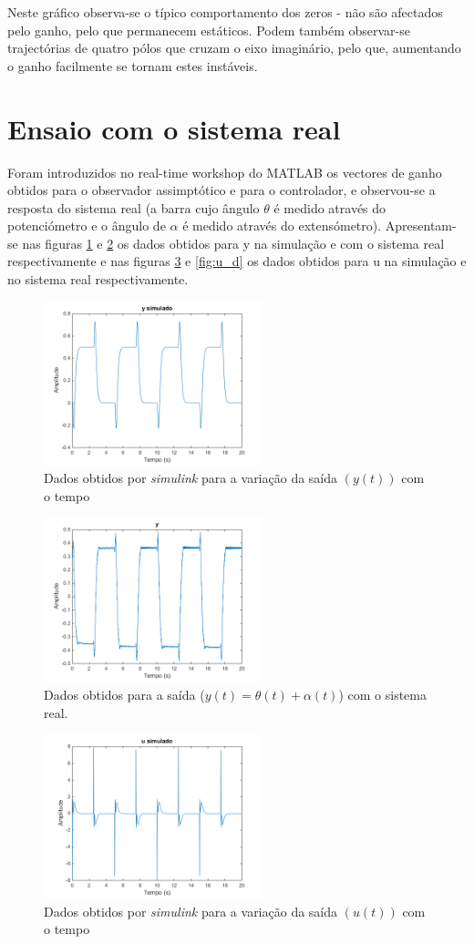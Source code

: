 \documentclass[%
  reprint,
  nofootinbib,
  amsmath,amssymb,
  aps,
  10pt,
  a4paper
]{revtex4-1}
\begin{document}
Neste gráfico observa-se o típico comportamento dos zeros - não são afectados pelo ganho, pelo que permanecem estáticos. Podem também observar-se trajectórias de quatro pólos que cruzam o eixo imaginário, pelo que, aumentando o ganho facilmente se tornam estes instáveis. 

\section{Ensaio com o sistema real}

Foram introduzidos no real-time workshop do MATLAB os vectores de ganho obtidos para o observador assimptótico e para o controlador, e observou-se a resposta do sistema real (a barra cujo ângulo $\theta$ é medido através do potenciómetro e o ângulo de $\alpha$ é medido através do extensómetro). Apresentam-se nas figuras \ref{fig:y_t} e \ref{fig:y_d} os dados obtidos para y na simulação e com o sistema real respectivamente e nas figuras \ref{fig:u_t} e \ref{fig:u_d} os dados obtidos para u na simulação e no sistema real respectivamente.
\begin{figure}[t]
\includegraphics[width=2.5in]{../img/y.png}
\caption{Dados obtidos por {\it simulink} para a variação da saída $(y(t))$ com o tempo}
\label{fig:y_t}
\end{figure}
\begin{figure}[t]
\includegraphics[width=2.5in]{../img/y_dados_01.png}
\caption{Dados obtidos para a saída ($y(t)=\theta(t)+\alpha(t)$) com o sistema real.}
\label{fig:y_d}
\end{figure}
\begin{figure}[t]
\includegraphics[width=2.5in]{../img/u.png}
\caption{Dados obtidos por {\it simulink} para a variação da saída $(u(t))$ com o tempo}
\label{fig:u_t}
\end{figure}
\end{document}
